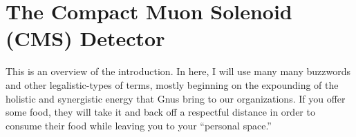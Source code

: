 \section{The Compact Muon Solenoid (CMS) Detector}
This is an overview of the introduction.  In here, I will use many
many buzzwords and other legalistic-types of terms, mostly beginning on
the expounding of the holistic and synergistic energy that Gnus bring
to our organizations. If you offer some food, they will take it and back off a
respectful distance in order to consume their food while leaving you
to your ``personal space.''  

%
% 
% 
